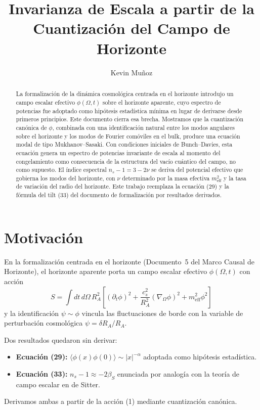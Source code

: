 \documentclass[12pt,a4paper]{article}
\title{Invarianza de Escala a partir de la Cuantizaci\'on del Campo de Horizonte}
\author{Kevin Mu\~noz}
\date{}
\begin{document}
\maketitle

\begin{abstract}
La formalización de la dinámica cosmológica centrada en el horizonte introdujo un campo escalar efectivo $\phi(\Omega, t)$ sobre el horizonte aparente, cuyo espectro de potencias fue adoptado como hipótesis estadística mínima en lugar de derivarse desde primeros principios. Este documento cierra esa brecha. Mostramos que la cuantización canónica de $\phi$, combinada con una identificación natural entre los modos angulares sobre el horizonte y los modos de Fourier comóviles en el bulk, produce una ecuación modal de tipo Mukhanov--Sasaki. Con condiciones iniciales de Bunch--Davies, esta ecuación genera un espectro de potencias invariante de escala al momento del congelamiento como consecuencia de la estructura del vacío cuántico del campo, no como supuesto. El índice espectral $n_s - 1 = 3 - 2\nu$ se deriva del potencial efectivo que gobierna los modos del horizonte, con $\nu$ determinado por la masa efectiva $m_\text{eff}^2$ y la tasa de variación del radio del horizonte. Este trabajo reemplaza la ecuación (29) y la fórmula del tilt (33) del documento de formalización por resultados derivados.
\end{abstract}

\section{Motivación}

En la formalización centrada en el horizonte (Documento~5 del Marco Causal de Horizonte), el horizonte aparente porta un campo escalar efectivo $\phi(\Omega, t)$ con acción
\begin{equation}
S = \int dt\, d\Omega\, R_A^2 \left[(\partial_t \phi)^2 + \frac{c_s^2}{R_A^2}(\nabla_\Omega \phi)^2 + m_\text{eff}^2 \phi^2\right] \tag{1}
\end{equation}
y la identificación $\psi \sim \phi$ vincula las fluctuaciones de borde con la variable de perturbación cosmológica $\psi = \delta R_A / R_A$.

Dos resultados quedaron sin derivar:
\begin{itemize}
  \item \textbf{Ecuación (29):} $\langle \phi(x)\phi(0) \rangle \sim |x|^{-\alpha}$ adoptada como hipótesis estadística.
  \item \textbf{Ecuación (33):} $n_s - 1 \approx -2\beta_S$ enunciada por analogía con la teoría de campo escalar en de Sitter.
\end{itemize}
Derivamos ambas a partir de la acción (1) mediante cuantización canónica.
\end{document}
